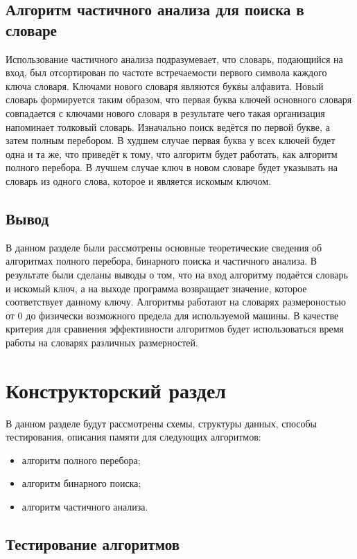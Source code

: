 \section{Алгоритм частичного анализа для поиска в словаре}
Использование частичного анализа подразумевает, что словарь, подающийся на вход, был отсортирован по частоте встречаемости первого символа каждого ключа словаря. Ключами нового словаря являются буквы алфавита. Новый словарь формируется таким образом, что первая буква ключей основного словаря совпадается с ключами нового словаря в результате чего такая организация напоминает толковый словарь. Изначально поиск ведётся по первой букве, а затем полным перебором. В худшем случае первая буква у всех ключей будет одна и та же, что приведёт к тому, что алгоритм будет работать, как алгоритм полного перебора. В лучшем случае ключ в новом словаре будет указывать на словарь из одного слова, которое и является искомым ключом.

\section{Вывод}
В данном разделе были рассмотрены основные теоретические сведения об алгоритмах полного перебора, бинарного поиска и частичного анализа. В результате были сделаны выводы о том, что на вход алгоритму подаётся словарь и искомый ключ, а на выходе программа возвращает значение, которое соответствует данному ключу. Алгоритмы работают на словарях размероностью от 0 до физически возможного предела для используемой машины. В качестве критерия для сравнения эффективности алгоритмов будет использоваться время работы на словарях различных размерностей.

\chapter{Конструкторский раздел}

В данном разделе будут рассмотрены схемы, структуры данных, способы тестирования, описания памяти для следующих алгоритмов:
\begin{itemize}
	\item алгоритм полного перебора;
	\item алгоритм бинарного поиска;
	\item алгоритм частичного анализа.
\end{itemize}

\section{Тестирование алгоритмов}


